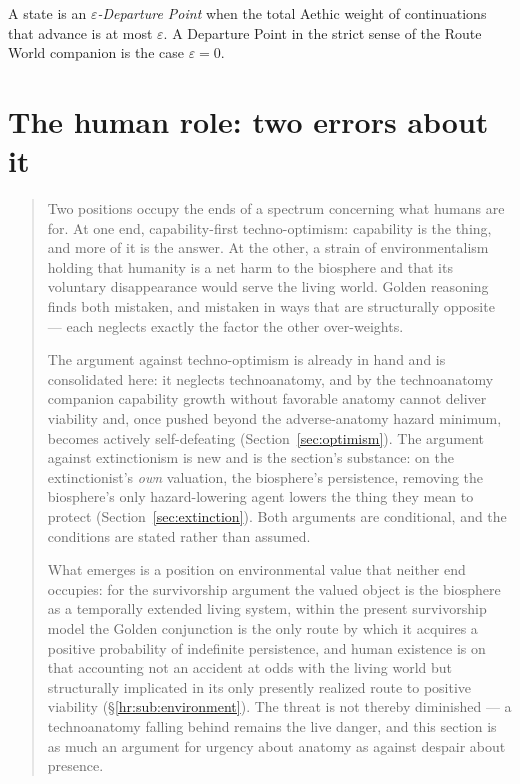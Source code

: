 \begin{definition}\label{gc:def:epsdep}
A state is an \emph{$\varepsilon$-Departure Point} when the total
Aethic weight of continuations that advance is at most $\varepsilon$. A
Departure Point in the strict sense of
the Route World companion \cite{GoldenRouteWorld} is the case $\varepsilon=0$.
\end{definition}

\section{The human role: two errors about it}\label{sec:errors}


\begin{quote}\small
Two positions occupy the ends of a spectrum concerning what humans are
for. At one end, capability-first techno-optimism: capability is the
thing, and more of it is the answer. At the other, a strain of environmentalism holding
that humanity is a net harm to the biosphere and that its voluntary
disappearance would serve the living world. Golden reasoning finds both
mistaken, and mistaken in ways that are structurally opposite --- each
neglects exactly the factor the other over-weights.

The argument against techno-optimism is already in hand and is
consolidated here: it neglects technoanatomy, and by
the technoanatomy companion \cite{GoldenTechnoanatomy} capability growth without favorable
anatomy cannot deliver viability and, once pushed beyond the
adverse-anatomy hazard minimum, becomes actively self-defeating
(Section~\ref{sec:optimism}). The argument against extinctionism is new and
is the section's substance: on the extinctionist's \emph{own} valuation, the biosphere's persistence, removing the biosphere's only
hazard-lowering agent lowers the thing they mean to protect
(Section~\ref{sec:extinction}). Both arguments are conditional, and the
conditions are stated rather than assumed.

What emerges is a position on environmental value that neither end
occupies: for the survivorship argument the valued object is the
biosphere as a temporally extended living system, within the present survivorship model the Golden conjunction is
the only route by which it acquires a positive probability of
indefinite persistence, and human
existence is on that accounting not an accident at odds with the living
world but structurally implicated in its only presently realized route
to positive viability
(\S\ref{hr:sub:environment}). The threat is not thereby diminished ---
a technoanatomy falling behind remains the live danger, and this section is as much an
argument for urgency about anatomy as against despair about presence.
\end{quote}






